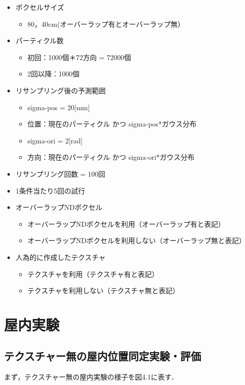\begin{itemize}
\item ボクセルサイズ
\begin{itemize}
\item 80，40cm(オーバーラップ有とオーバーラップ無）
\end{itemize}
 \item パーティクル数
\begin{itemize}
      \item 初回：1000個＊72方向 = 72000個
	\item 2回以降：1000個
\end{itemize}
 \item リサンプリング後の予測範囲
\begin{itemize}
      \item sigma-pos = 20[mm]
      \item 位置：現在のパーティクル かつ sigma-pos*ガウス分布
	\item sigma-ori = 2[rad]
      \item 方向：現在のパーティクル かつ sigma-ori*ガウス分布 
\end{itemize}
\item リサンプリング回数 = 100回
\item 1条件当たり5回の試行
\item オーバーラップNDボクセル
\begin{itemize}
      \item オーバーラップNDボクセルを利用（オーバーラップ有と表記）
	\item オーバーラップNDボクセルを利用しない（オーバーラップ無と表記）
\end{itemize}
\item 人為的に作成したテクスチャ
\begin{itemize}
      \item テクスチャを利用（テクスチャ有と表記）
	\item テクスチャを利用しない（テクスチャ無と表記）
\end{itemize}
\end{itemize}

\newpage

\section{屋内実験}

\subsection{テクスチャー無の屋内位置同定実験・評価}
まず，テクスチャー無の屋内実験の様子を図4.1に表す．

